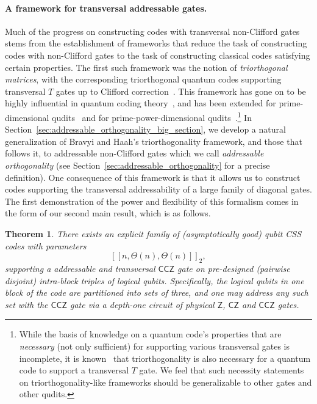 \documentclass[11pt]{article}
\newtheorem{theorem}{Theorem}[section]
\theoremstyle{definition}
\newcommand{\CCZ}{\mathsf{CCZ}}
\begin{document}
    \paragraph{A framework for transversal addressable gates.} 
    Much of the progress on constructing codes with transversal non-Clifford gates stems from the establishment of frameworks that reduce the task of constructing codes with non-Clifford gates to the task of constructing classical codes satisfying certain properties. The first such framework was the notion of \emph{triorthogonal matrices}, with the corresponding triorthogonal quantum codes supporting transversal $T$ gates up to Clifford correction~\cite{bravyi2012magic}. This framework has gone on to be highly influential in quantum coding theory~\cite{eczoo_quantum_triorthogonal}, and has been extended for prime-dimensional qudits~\cite{krishna2019towards} and for prime-power-dimensional qudits~\cite{wills2024constant}.\footnote{While the basis of knowledge on a quantum code's properties that are \textit{necessary} (not only sufficient) for supporting various transversal gates is incomplete, it is known~\cite{rengaswamy2020optimality} that triorthogonality is also necessary for a quantum code to support a transversal $T$ gate. We feel that such necessity statements on triorthogonality-like frameworks should be generalizable to other gates and other qudits.} 
    In Section~\ref{sec:addressable_orthogonality_big_section}, we develop a natural generalization of Bravyi and Haah's triorthogonality framework, and those that follows it, to addressable non-Clifford gates which we call \emph{addressable orthogonality} (see Section~\ref{sec:addressable_orthogonality} for a precise definition). One consequence of this framework is that it allows us to construct codes supporting the transversal addressability of a large family of diagonal gates. The first demonstration of the power and flexibility of this formalism comes in the form of our second main result, which is as follows.
    \begin{theorem}\label{thm:main_result_2}
        There exists an explicit family of (asymptotically good) qubit CSS codes with parameters
        \begin{equation}
            \left[\left[n,\Theta(n),\Theta(n)\right]\right]_2,
        \end{equation}
        supporting a addressable and transversal  $\CCZ$ gate on pre-designed (pairwise disjoint) intra-block triples of logical qubits. Specifically, the logical qubits in one block of the code are partitioned into sets of three, and one may address any such set with the $\CCZ$ gate via a depth-one circuit of physical $\mathsf{Z}$, $\mathsf{CZ}$ and $\mathsf{CCZ}$ gates.
    \end{theorem}
\end{document}
